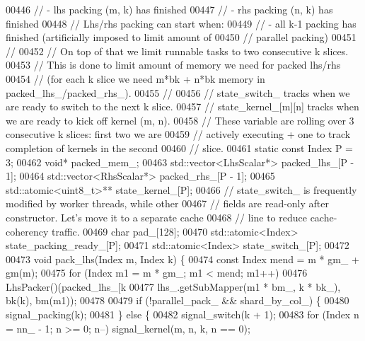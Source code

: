 \begin{DoxyCode}
00446     \textcolor{comment}{//  - lhs packing (m, k) has finished}
00447     \textcolor{comment}{//  - rhs packing (n, k) has finished}
00448     \textcolor{comment}{// Lhs/rhs packing can start when:}
00449     \textcolor{comment}{//  - all k-1 packing has finished (artificially imposed to limit amount of}
00450     \textcolor{comment}{//  parallel packing)}
00451     \textcolor{comment}{//}
00452     \textcolor{comment}{// On top of that we limit runnable tasks to two consecutive k slices.}
00453     \textcolor{comment}{// This is done to limit amount of memory we need for packed lhs/rhs}
00454     \textcolor{comment}{// (for each k slice we need m*bk + n*bk memory in packed\_lhs\_/packed\_rhs\_).}
00455     \textcolor{comment}{//}
00456     \textcolor{comment}{// state\_switch\_ tracks when we are ready to switch to the next k slice.}
00457     \textcolor{comment}{// state\_kernel\_[m][n] tracks when we are ready to kick off kernel (m, n).}
00458     \textcolor{comment}{// These variable are rolling over 3 consecutive k slices: first two we are}
00459     \textcolor{comment}{// actively executing + one to track completion of kernels in the second}
00460     \textcolor{comment}{// slice.}
00461     \textcolor{keyword}{static} \textcolor{keyword}{const} Index P = 3;
00462     \textcolor{keywordtype}{void}* packed\_mem\_;
00463     std::vector<LhsScalar*> packed\_lhs\_[P - 1];
00464     std::vector<RhsScalar*> packed\_rhs\_[P - 1];
00465     std::atomic<uint8\_t>** state\_kernel\_[P];
00466     \textcolor{comment}{// state\_switch\_ is frequently modified by worker threads, while other}
00467     \textcolor{comment}{// fields are read-only after constructor. Let's move it to a separate cache}
00468     \textcolor{comment}{// line to reduce cache-coherency traffic.}
00469     \textcolor{keywordtype}{char} pad\_[128];
00470     std::atomic<Index> state\_packing\_ready\_[P];
00471     std::atomic<Index> state\_switch\_[P];
00472 
00473     \textcolor{keywordtype}{void} pack\_lhs(Index m, Index k) \{
00474       \textcolor{keyword}{const} Index mend = m * gm\_ + gm(m);
00475       \textcolor{keywordflow}{for} (Index m1 = m * gm\_; m1 < mend; m1++)
00476         LhsPacker()(packed\_lhs\_[k %
00477                     lhs\_.getSubMapper(m1 * bm\_, k * bk\_), bk(k), bm(m1));
00478 
00479       \textcolor{keywordflow}{if} (!parallel\_pack\_ && shard\_by\_col\_) \{
00480         signal\_packing(k);
00481       \} \textcolor{keywordflow}{else} \{
00482         signal\_switch(k + 1);
00483         \textcolor{keywordflow}{for} (Index n = nn\_ - 1; n >= 0; n--) signal\_kernel(m, n, k, n == 0);

\end{DoxyCode}
